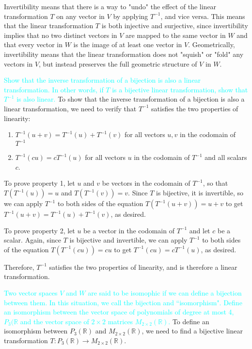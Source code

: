 \documentclass[fontsize=12pt]{scrartcl}
\begin{document}
\noindent
Invertibility means that there is a way to "undo" the effect of the linear transformation $T$ on any vector in $V$ by applying $T^{-1}$, and vice versa. This means that the linear transformation $T$ is both injective and surjective, since invertibility implies that no two distinct vectors in $V$ are mapped to the same vector in $W$ and that every vector in $W$ is the image of at least one vector in $V$. Geometrically, invertibility means that the linear transformation does not "squish" or "fold" any vectors in $V$, but instead preserves the full geometric structure of $V$ in $W$.

\newpage
\noindent
\textcolor{cyan}{Show that the inverse transformation of a bijection is also a linear transformation. In other words, if $T$ is a bijective linear transformation, show that $T^{-1}$ is also linear.}
\noindent
To show that the inverse transformation of a bijection is also a linear transformation, we need to verify that $T^{-1}$ satisfies the two properties of linearity:
\begin{enumerate}
	\item $T^{-1}(u+v) = T^{-1}(u) + T^{-1}(v)$ for all vectors $u, v$ in the codomain of $T^{-1}$
	\item $T^{-1}(cu) = c T^{-1}(u)$ for all vectors $u$ in the codomain of $T^{-1}$ and all scalars $c$.
\end{enumerate}
\noindent
To prove property 1, let $u$ and $v$ be vectors in the codomain of $T^{-1}$, so that $T(T^{-1}(u)) = u$ and $T(T^{-1}(v)) = v$. Since $T$ is bijective, it is invertible, so we can apply $T^{-1}$ to both sides of the equation $T(T^{-1}(u+v)) = u+v$ to get $T^{-1}(u+v) = T^{-1}(u) + T^{-1}(v)$, as desired.

\noindent
To prove property 2, let $u$ be a vector in the codomain of $T^{-1}$ and let $c$ be a scalar. Again, since $T$ is bijective and invertible, we can apply $T^{-1}$ to both sides of the equation $T(T^{-1}(cu)) = cu$ to get $T^{-1}(cu) = cT^{-1}(u)$, as desired.

\noindent
Therefore, $T^{-1}$ satisfies the two properties of linearity, and is therefore a linear transformation.

\noindent
\textcolor{cyan}{Two vector spaces $V$ and $W$ are said to be isomophic if we can define a bijection between them. In this situation, we call the bijection and ``isomorphism". Define an isomorphism between the vector space of polynomials of degree at most 4, $P_3(\mathbb{R}$ and the vector space of $2 \times 2$ matrices $M_{2 \times 2}(\mathbb{R})$.}
\noindent
To define an isomorphism between $P_3(\mathbb{R})$ and $M_{2 \times 2}(\mathbb{R})$, we need to find a bijective linear transformation $T: P_3(\mathbb{R}) \to M_{2 \times 2}(\mathbb{R})$.
\end{document}
